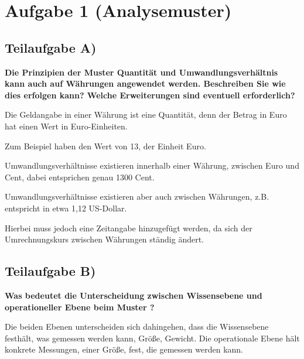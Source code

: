 \section{Aufgabe 1 (Analysemuster)}

\subsection{Teilaufgabe A)}
\textbf{Die Prinzipien der Muster Quantität und Umwandlungsverhältnis kann auch auf
Währungen angewendet werden. Beschreiben Sie wie dies erfolgen kann? Welche
Erweiterungen sind eventuell erforderlich?}

Die Geldangabe in einer Währung ist eine Quantität, denn der Betrag in \zB Euro
hat einen Wert in Euro-Einheiten. 

Zum Beispiel  haben den Wert von 13, der Einheit Euro.

Umwandlungsverhältnisse existieren innerhalb einer Währung, \zB zwischen Euro
und Cent, dabei entsprichen  genau 1300 Cent. 

Umwandlungsverhältnisse existieren aber auch zwischen Währungen, z.B.
entspricht  in etwa 1,12 US-Dollar. 

Hierbei muss jedoch eine Zeitangabe hinzugefügt werden, da sich der
Umrechnungskurs zwischen Währungen ständig ändert.

\subsection{Teilaufgabe B)}
\textbf{Was bedeutet die Unterscheidung zwischen Wissensebene und operationeller Ebene
beim Muster ?}

Die beiden Ebenen unterscheiden sich dahingehen, dass die Wissensebene
festhält, was gemessen werden kann, \zB Größe, Gewicht. Die operationale Ebene
hält konkrete Messungen, \zB einer Größe, fest, die gemessen werden kann.
\clearpage
